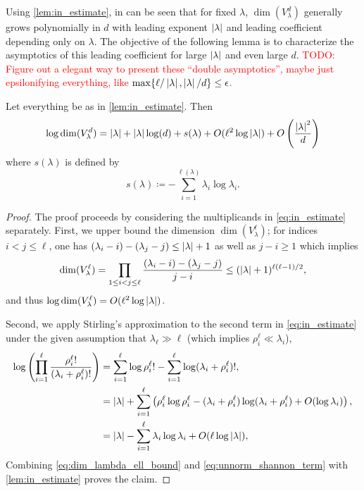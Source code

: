 \documentclass[notitlepage, 10pt]{article}
\begin{document}
Using \cref{lem:in_estimate}, in can be seen that for fixed $\lambda$, $\dim(V_{\lambda}^{d})$ generally grows polynomially in $d$ with leading exponent $\left|\lambda\right|$ and leading coefficient depending only on $\lambda$.
The objective of the following lemma is to characterize the asymptotics of this leading coefficient for large $\left|\lambda\right|$ and even large $d$.
\textcolor{red}{TODO: Figure out a elegant way to present these ``double asymptotics'', maybe just epsilonifying everything, like $\max\{\ell/\left|\lambda\right|, \left|\lambda\right|/d\} \leq \epsilon$.}
\begin{lem}
    \label{lem:double_asymptotics}
    Let everything be as in \cref{lem:in_estimate}. Then
    \begin{equation}
        \log \dim (V_{\lambda}^{d}) = \left|\lambda\right| + \left|\lambda\right|\log(d) + s(\lambda) + O(\ell^2 \log \left|\lambda\right|) + O\left(\frac{\left|\lambda\right|^2}{d}\right)
    \end{equation}
    where $s(\lambda)$ is defined by
    \begin{equation}
        \label{eq:unnorm_shannon}
        s(\lambda) \coloneqq -\sum_{i=1}^{\ell(\lambda)} \lambda_i \log \lambda_i.
    \end{equation}
\end{lem}
\begin{proof}
    The proof proceeds by considering the multiplicands in \cref{eq:in_estimate} separately.
    First, we upper bound the dimension $\dim(V_{\lambda}^{\ell})$; for indices $i<j\leq \ell$, one has $(\lambda_i-i)-(\lambda_j-j) \leq \left|\lambda\right| + 1$ as well as $j-i \geq 1$ which implies
    \begin{equation}
        \label{eq:dim_lambda_ell_bound}
        \dim(V_{\lambda}^{\ell}) = \prod_{1 \leq i<j\leq \ell} \frac{(\lambda_i-i)-(\lambda_j-j)}{j-i} \leq (\left|\lambda\right|+1)^{\ell(\ell-1)/2},
    \end{equation}
    and thus $\log \dim(V_{\lambda}^{\ell}) = O(\ell^2 \log \left|\lambda\right|)$.

    Second, we apply Stirling's approximation \cite{robbins1955remark} to the second term in \cref{eq:in_estimate} under the given assumption that $\lambda_{\ell} \gg \ell$ (which implies $\rho^{\ell}_{i} \ll \lambda_{i}$),
    \begin{align}
        \log\left(\prod_{i=1}^{\ell}\frac{\rho^{\ell}_{i}!}{(\lambda_i + \rho^{\ell}_{i}) !}\right) 
        &= \sum_{i=1}^{\ell}\log \rho^{\ell}_i! - \sum_{i=1}^{\ell} \log (\lambda_i + \rho^{\ell}_i)!, \\
        &= \left|\lambda\right| + \sum_{i=1}^{\ell} \left(\rho^{\ell}_i\log \rho^{\ell}_i - (\lambda_i + \rho^{\ell}_i)\log (\lambda_i + \rho^{\ell}_i)+ O(\log \lambda_i )\right), \\
        &= \left|\lambda\right| - \sum_{i=1}^{\ell} \lambda_i\log \lambda_i + O( \ell \log \left|\lambda\right| ), \\
        \label{eq:unnorm_shannon_term}
    \end{align}
    Combining \cref{eq:dim_lambda_ell_bound} and \cref{eq:unnorm_shannon_term} with \cref{lem:in_estimate} proves the claim.
\end{proof}
\end{document}
